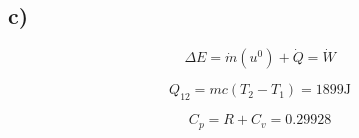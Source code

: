 

\subsection*{c)}

\begin{equation*}
\Delta E = \dot{m} (u^0) + \dot{Q} = \dot{W}
\end{equation*}

\begin{equation*}
Q_{12} = m c (T_2 - T_1) = 1899 \text{J}
\end{equation*}

\begin{equation*}
C_p = R + C_v = 0.29928
\end{equation*}